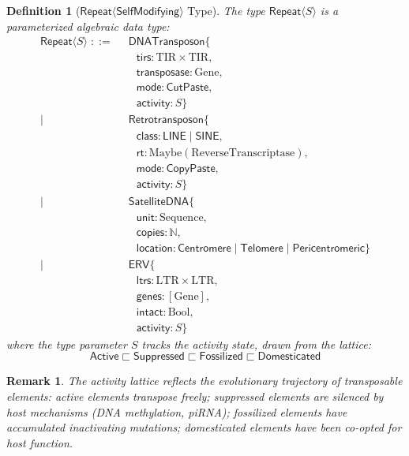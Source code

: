 \documentclass[12pt,a4paper]{article}
\newtheorem{definition}[theorem]{Definition}
\newtheorem{remark}[theorem]{Remark}
\newcommand{\Repeat}{\mathsf{Repeat}}
\newcommand{\LINE}{\mathsf{LINE}}
\newcommand{\SINE}{\mathsf{SINE}}
\newcommand{\ERV}{\mathsf{ERV}}
\begin{document}
\begin{definition}[$\Repeat\langle\mathsf{SelfModifying}\rangle$ Type]\label{def:repeat-type}
The type $\Repeat\langle S \rangle$ is a parameterized algebraic data type:
\begin{align*}
\Repeat\langle S \rangle \;::=\;&\; \mathsf{DNATransposon}\{\\
  &\quad \mathsf{tirs} : \mathrm{TIR} \times \mathrm{TIR},\\
  &\quad \mathsf{transposase} : \mathrm{Gene},\\
  &\quad \mathsf{mode} : \mathsf{CutPaste},\\
  &\quad \mathsf{activity} : S \}\\
  \mid\;&\; \mathsf{Retrotransposon}\{\\
  &\quad \mathsf{class} : \LINE \mid \SINE,\\
  &\quad \mathsf{rt} : \mathrm{Maybe}(\mathrm{ReverseTranscriptase}),\\
  &\quad \mathsf{mode} : \mathsf{CopyPaste},\\
  &\quad \mathsf{activity} : S \}\\
  \mid\;&\; \mathsf{SatelliteDNA}\{\\
  &\quad \mathsf{unit} : \mathrm{Sequence},\\
  &\quad \mathsf{copies} : \mathbb{N},\\
  &\quad \mathsf{location} : \mathsf{Centromere} \mid \mathsf{Telomere} \mid \mathsf{Pericentromeric} \}\\
  \mid\;&\; \ERV\{\\
  &\quad \mathsf{ltrs} : \mathrm{LTR} \times \mathrm{LTR},\\
  &\quad \mathsf{genes} : [\mathrm{Gene}],\\
  &\quad \mathsf{intact} : \mathrm{Bool},\\
  &\quad \mathsf{activity} : S \}
\end{align*}
where the type parameter $S$ tracks the activity state, drawn from the lattice:
\[
  \mathsf{Active} \sqsubset \mathsf{Suppressed} \sqsubset \mathsf{Fossilized} \sqsubset \mathsf{Domesticated}
\]
\end{definition}

\begin{remark}
The activity lattice reflects the evolutionary trajectory of transposable elements:
active elements transpose freely; suppressed elements are silenced by host mechanisms
(DNA methylation, piRNA); fossilized elements have accumulated inactivating mutations;
domesticated elements have been co-opted for host function.
\end{remark}
\end{document}
